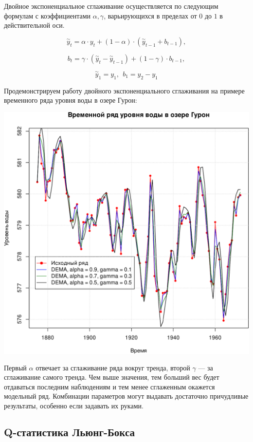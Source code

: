 \documentclass[
]{article}
\begin{document}
Двойное экспоненциальное сглаживание осуществляется по следующим
формулам с коэффициентами \(\alpha,\gamma\), варьирующихся в пределах от
\(0\) до \(1\) в действительной оси.

\[
\overset{\sim}{y}_t = \alpha \cdot y_t + (1-\alpha) \cdot (\overset{\sim}{y}_{t-1}+b_{t-1}),
\]

\[
b_t = \gamma \cdot (\overset{\sim}{y}_t - \overset{\sim}{y}_{t-1}) + (1-\gamma) \cdot b_{t-1},
\]

\[
\overset{\sim}{y}_1=y_1,\ \  b_1=y_2-y_1
\]

Продемонстрируем работу двойного экспоненциального сглаживания на
примере временного ряда уровня воды в озере Гурон:

\begin{center}\includegraphics[width=0.6\linewidth]{Prac6_files/figure-latex/unnamed-chunk-14-1} \end{center}

Первый \(\alpha\) отвечает за сглаживание ряда вокруг тренда, второй
\(\gamma\) --- за сглаживание самого тренда. Чем выше значения, тем
больший вес будет отдаваться последним наблюдениям и тем менее
сглаженным окажется модельный ряд. Комбинации параметров могут выдавать
достаточно причудливые результаты, особенно если задавать их руками.

\hypertarget{q-ux441ux442ux430ux442ux438ux441ux442ux438ux43aux430-ux43bux44cux44eux43dux433-ux431ux43eux43aux441ux430}{%
\subsection{\texorpdfstring{\textbf{Q-статистика
Льюнг-Бокса}}{Q-статистика Льюнг-Бокса}}\label{q-ux441ux442ux430ux442ux438ux441ux442ux438ux43aux430-ux43bux44cux44eux43dux433-ux431ux43eux43aux441ux430}}
\end{document}

